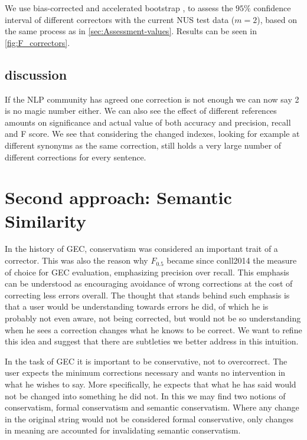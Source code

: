 \documentclass[english]{article}
\begin{document}
{We use bias-corrected and accelerated bootstrap \cite{efron1987better}, to assess the $95\%$ confidence interval of different correctors with the current NUS test data ($m=2$), based on the same process as in \ref{sec:Assessment-values}. Results can be seen in \ref{fig:F_correctors}.

\subsection{discussion}

If the NLP community has agreed one correction is not enough\cite{tetreault2008native}
we can now say 2 is no magic number either. We can also see the effect of different references amounts on significance and actual value of both accuracy and precision, recall and F score.
We see that considering the changed indexes, looking for example at different synonyms as the same correction, still holds a very large number of different corrections for every sentence.


\section{Second approach: Semantic Similarity\label{sec:Semantics}}


In the history of GEC, conservatism was considered an
important trait of a corrector\cite{brockett2006correcting}.
This was also the reason why $F_{0.5}$ became since conll2014\cite{ng2014conll}
the measure of choice for GEC evaluation, emphasizing
precision over recall. This emphasis can be understood as encouraging
avoidance of wrong corrections at the cost of correcting less errors
overall. The thought that stands behind such emphasis is that a user
would be understanding towards errors he did, of which he is probably
not even aware, not being corrected, but would not be so understanding
when he sees a correction changes what he knows to be correct. We want to refine
this idea and suggest that there are subtleties we better address
in this intuition.

In the task of GEC it is important to be
conservative, not to overcorrect. The user expects the minimum corrections
necessary and wants no intervention in what he wishes to say. More
specifically, he expects that what he has said would not be changed
into something he did not. In this we may find two notions of conservatism,
formal conservatism and semantic conservatism. Where any change in
the original string would not be considered formal conservative, only
changes in meaning are accounted for invalidating semantic conservatism. 

}
\end{document}
